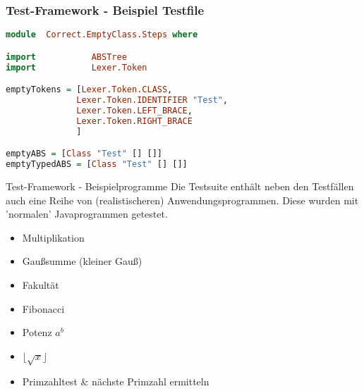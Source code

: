 \begin{frame}[fragile]
\frametitle{Test-Framework - Beispiel Testfile}
\begin{lstlisting}[language=Haskell]
module  Correct.EmptyClass.Steps where

import           ABSTree
import           Lexer.Token

emptyTokens = [Lexer.Token.CLASS,
              Lexer.Token.IDENTIFIER "Test",
              Lexer.Token.LEFT_BRACE,
              Lexer.Token.RIGHT_BRACE
              ]

emptyABS = [Class "Test" [] []]
emptyTypedABS = [Class "Test" [] []]	
\end{lstlisting}
	
\end{frame}

\begin{frame}{Test-Framework - Beispielprogramme}
Die Testsuite enthält neben den Testfällen auch eine Reihe von (realistischeren) Anwendungsprogrammen. Diese wurden mit 'normalen' Javaprogrammen getestet.

\pause

\begin{itemize}
	\item Multiplikation \pause 
	\item Gaußsumme (kleiner Gauß) \pause
	\item Fakultät \pause
	\item Fibonacci \pause
	\item Potenz $a^b$ \pause 
	\item $\lfloor \sqrt{x} \rfloor$ \pause
	\item Primzahltest \& nächste Primzahl ermitteln
\end{itemize}	
\end{frame}


